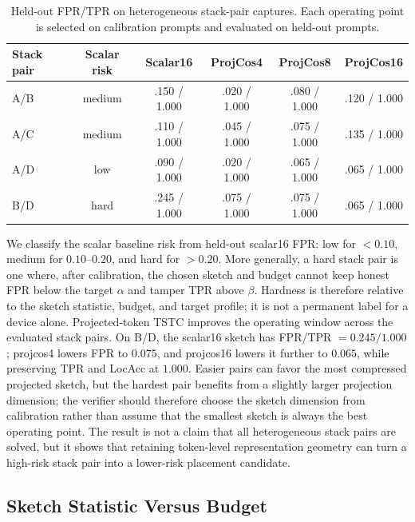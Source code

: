 \documentclass[sigplan,screen,review,anonymous]{acmart}
\begin{document}
\begin{table}[t]
\centering
\caption{Held-out FPR/TPR on heterogeneous stack-pair captures. Each operating point is selected on calibration prompts and evaluated on held-out prompts.}
\label{tab:pair-family-projcos}
\scriptsize
\setlength{\tabcolsep}{3pt}
\begin{tabular}{lccccc}
\toprule
\textbf{Stack pair} & \textbf{Scalar risk} & \textbf{Scalar16} & \textbf{ProjCos4} & \textbf{ProjCos8} & \textbf{ProjCos16} \\
\midrule
A/B & medium & .150 / 1.000 & .020 / 1.000 & .080 / 1.000 & .120 / 1.000 \\
A/C & medium & .110 / 1.000 & .045 / 1.000 & .075 / 1.000 & .135 / 1.000 \\
A/D & low & .090 / 1.000 & .020 / 1.000 & .065 / 1.000 & .065 / 1.000 \\
B/D & hard & .245 / 1.000 & .075 / 1.000 & .075 / 1.000 & .065 / 1.000 \\
\bottomrule
\end{tabular}
\end{table}

We classify the scalar baseline risk from held-out scalar16 FPR: low for
\(<0.10\), medium for \(0.10\)--\(0.20\), and hard for \(>0.20\). More
generally, a hard stack pair is one where, after calibration, the chosen sketch
and budget cannot keep honest FPR below the target \(\alpha\) and tamper TPR
above \(\beta\). Hardness is therefore relative to the sketch statistic,
budget, and target profile; it is not a permanent label for a device alone.
Projected-token TSTC improves the operating window across the evaluated stack
pairs. On B/D, the scalar16 sketch has FPR/TPR \(=0.245/1.000\); projcos4
lowers FPR to \(0.075\), and projcos16 lowers it further to \(0.065\), while
preserving TPR and LocAcc at \(1.000\). Easier pairs can favor the most
compressed projected sketch, but the hardest pair benefits from a slightly
larger projection dimension; the verifier should therefore choose the sketch
dimension from calibration rather than assume that the smallest sketch is
always the best operating point. The result is not a claim that all
heterogeneous stack pairs are solved, but it shows that retaining token-level
representation geometry can turn a high-risk stack pair into a lower-risk
placement candidate.

\subsection{Sketch Statistic Versus Budget}
\label{subsec:eval-equal-budget}
\end{document}
